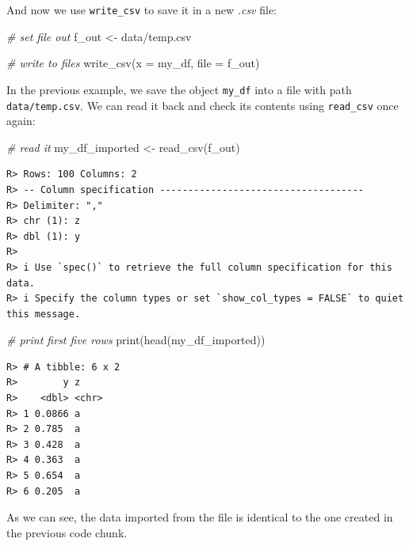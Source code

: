 \documentclass[
  12pt,
]{book}
\newenvironment{Shaded}{\begin{snugshade}}{\end{snugshade}}
\newcommand{\AttributeTok}[1]{\textcolor[rgb]{0.61,0.61,0.61}{#1}}
\newcommand{\CommentTok}[1]{\textcolor[rgb]{0.37,0.37,0.37}{\textit{#1}}}
\newcommand{\FunctionTok}[1]{\textcolor[rgb]{0,0,0}{#1}}
\newcommand{\NormalTok}[1]{#1}
\newcommand{\OtherTok}[1]{\textcolor[rgb]{0.37,0.37,0.37}{#1}}
\newcommand{\StringTok}[1]{\textcolor[rgb]{0.5,0.5,0.5}{#1}}
\begin{document}
And now we use \texttt{write\_csv} to save it in a new \emph{.csv} file:

\begin{Shaded}
\begin{Highlighting}[]
\CommentTok{\# set file out}
\NormalTok{f\_out }\OtherTok{\textless{}{-}} \StringTok{\textquotesingle{}data/temp.csv\textquotesingle{}}

\CommentTok{\# write to files}
\FunctionTok{write\_csv}\NormalTok{(}\AttributeTok{x =}\NormalTok{ my\_df,  }
          \AttributeTok{file =}\NormalTok{ f\_out)}
\end{Highlighting}
\end{Shaded}

In the previous example, we save the object \texttt{my\_df} into a file with path \texttt{data/temp.csv}. We can read it back and check its contents using \texttt{read\_csv} once again:

\begin{Shaded}
\begin{Highlighting}[]
\CommentTok{\# read it}
\NormalTok{my\_df\_imported }\OtherTok{\textless{}{-}} \FunctionTok{read\_csv}\NormalTok{(f\_out)}
\end{Highlighting}
\end{Shaded}

\begin{verbatim}
R> Rows: 100 Columns: 2
R> -- Column specification ------------------------------------
R> Delimiter: ","
R> chr (1): z
R> dbl (1): y
R> 
R> i Use `spec()` to retrieve the full column specification for this data.
R> i Specify the column types or set `show_col_types = FALSE` to quiet this message.
\end{verbatim}

\begin{Shaded}
\begin{Highlighting}[]
\CommentTok{\# print first five rows}
\FunctionTok{print}\NormalTok{(}\FunctionTok{head}\NormalTok{(my\_df\_imported))}
\end{Highlighting}
\end{Shaded}

\begin{verbatim}
R> # A tibble: 6 x 2
R>        y z    
R>    <dbl> <chr>
R> 1 0.0866 a    
R> 2 0.785  a    
R> 3 0.428  a    
R> 4 0.363  a    
R> 5 0.654  a    
R> 6 0.205  a
\end{verbatim}

As we can see, the data imported from the file is identical to the one created in the previous code chunk.
\end{document}
